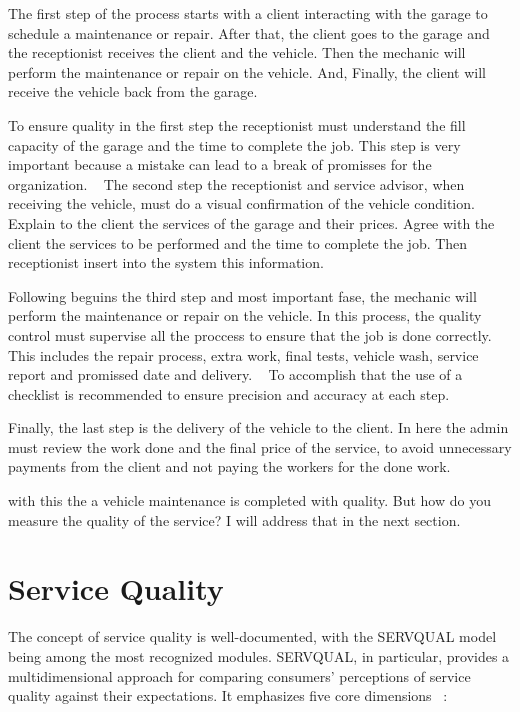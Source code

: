 The first step of the process starts with a client interacting with the garage to schedule a maintenance or repair. 
After that, the client goes to the garage and the receptionist receives the client and the vehicle.
Then the mechanic will perform the maintenance or repair on the vehicle.
And, Finally, the client will receive the vehicle back from the garage.

To ensure quality in the first step the receptionist must understand the fill capacity of the garage and the time to complete the job. 
This step is very important because a mistake can lead to a break of promisses for the organization. ~\cite{Setting_the_after_sale_process}
The second step the receptionist and service advisor, when receiving the vehicle, must do a visual confirmation of the vehicle condition. ~\cite{Setting_the_after_sale_process}
Explain to the client the services of the garage and their prices. Agree with the client the services to be performed and the time to complete the job. 
Then receptionist insert into the system this information. ~\cite{Setting_the_after_sale_process}

Following beguins the third step and most important fase, the mechanic will perform the maintenance or repair on the vehicle. 
In this process, the quality control must supervise all the proccess to ensure that the job is done correctly. ~\cite{Setting_the_after_sale_process}
This includes the repair process, extra work, final tests, vehicle wash, service report and promissed date and delivery. ~\cite{Setting_the_after_sale_process}
To accomplish that the use of a checklist is recommended to ensure precision and accuracy at each step. ~\cite{Setting_the_after_sale_process}

Finally, the last step is the delivery of the vehicle to the client. 
In here  the admin must review the work done and the final price of the service, to avoid unnecessary payments from the client and not paying the workers for the done work. ~\cite{Setting_the_after_sale_process}

with this the a vehicle maintenance is completed with quality. 
But how do you measure the quality of the service?
I will address that in the next section.

\section{Service Quality}
The concept of service quality is well-documented, with the SERVQUAL model being among the most recognized modules. 
SERVQUAL, in particular, provides a multidimensional approach for comparing consumers' perceptions of service quality against their expectations. 
It emphasizes five core dimensions ~\cite{SERVQUAL_OLD}:

